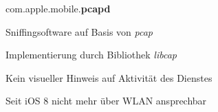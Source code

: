 \begin{frame}
	\centering
	com.apple.mobile.\textbf{pcapd}
	\begin{block}{}
		Sniffingsoftware auf Basis von \textsl{pcap}
	\end{block}
	\begin{block}{}
		Implementierung durch Bibliothek \textsl{libcap}
	\end{block}
	\begin{block}{}
		Kein visueller Hinweis auf Aktivität des Dienstes
	\end{block}
	\begin{block}{}
		Seit iOS 8 nicht mehr über WLAN ansprechbar
	\end{block}
\end{frame}